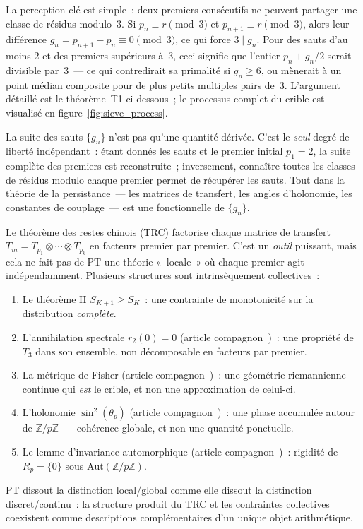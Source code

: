 \documentclass[12pt,a4paper]{article}
\begin{document}
La perception clé est simple~: deux premiers consécutifs ne peuvent
partager une classe de résidus modulo~3. Si $p_n \equiv r \pmod{3}$
et $p_{n+1} \equiv r \pmod{3}$, alors leur différence
$g_n = p_{n+1} - p_n \equiv 0 \pmod{3}$, ce qui force $3 \mid g_n$.
Pour des sauts d'au moins 2 et des premiers supérieurs à~3, ceci
signifie que l'entier $p_n + g_n/2$ serait divisible par~3~--- ce qui
contredirait sa primalité si $g_n \geq 6$, ou mènerait à un point
médian composite pour de plus petits multiples pairs de~3.
L'argument détaillé est le théorème~T1 ci-dessous~; le processus
complet du crible est visualisé en figure~\ref{fig:sieve_process}.

La suite des sauts $\{g_n\}$ n'est pas qu'une quantité dérivée.
C'est le \emph{seul} degré de liberté indépendant~: étant donnés les
sauts et le premier initial $p_1 = 2$, la suite complète des premiers
est reconstruite~; inversement, connaître toutes les classes de
résidus modulo chaque premier permet de récupérer les sauts.
Tout dans la théorie de la persistance~--- les matrices de transfert,
les angles d'holonomie, les constantes de couplage~--- est une
fonctionnelle de $\{g_n\}$.

\begin{remarque}
\label{rem:ch1_not_local}
Le théorème des restes chinois (TRC) factorise chaque matrice de
transfert $T_m = T_{p_1} \otimes \cdots \otimes T_{p_k}$ en facteurs
premier par premier. C'est un \emph{outil} puissant, mais cela ne
fait pas de PT une théorie «~locale~» où chaque premier agit
indépendamment. Plusieurs structures sont intrinsèquement collectives~:
\begin{enumerate}[nosep]
\item Le théorème H $S_{K+1} \geq S_K$~: une contrainte de
  monotonicité sur la distribution \emph{complète}.
\item L'annihilation spectrale $r_2(0) = 0$ (article
  compagnon~\cite{companion_M3})~: une propriété de $T_3$ dans son
  ensemble, non décomposable en facteurs par premier.
\item La métrique de Fisher (article compagnon~\cite{companion_M2})~:
  une géométrie riemannienne continue qui \emph{est} le crible, et
  non une approximation de celui-ci.
\item L'holonomie $\sin^2(\theta_p)$ (article
  compagnon~\cite{companion_M2})~: une phase accumulée autour de
  $\mathbb{Z}/p\mathbb{Z}$~--- cohérence globale, et non une quantité
  ponctuelle.
\item Le lemme d'invariance automorphique (article
  compagnon~\cite{companion_M3})~: rigidité de $R_p = \{0\}$ sous
  $\mathrm{Aut}(\mathbb{Z}/p\mathbb{Z})$.
\end{enumerate}
PT dissout la distinction local/global comme elle dissout la
distinction discret/continu~: la structure produit du TRC et les
contraintes collectives coexistent comme descriptions complémentaires
d'un unique objet arithmétique.
\end{remarque}
\end{document}
